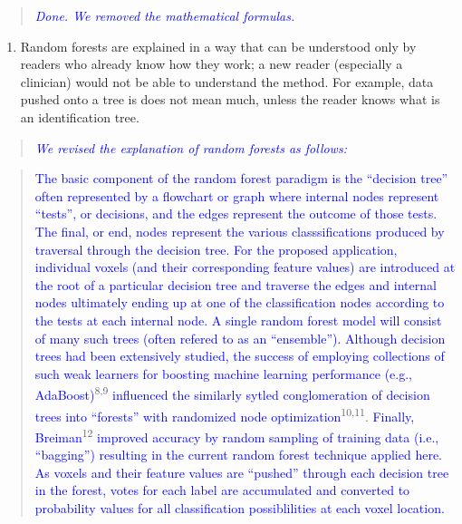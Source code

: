 \documentclass[12pt,]{article}
\providecommand{\tightlist}{%
  \setlength{\itemsep}{0pt}\setlength{\parskip}{0pt}}
\begin{document}
\begin{quote}
\emph{\textcolor{blue}{Done.  We removed the mathematical formulas.}}
\end{quote}

\begin{enumerate}
\def\labelenumi{\arabic{enumi}.}
\setcounter{enumi}{6}
\tightlist
\item
  Random forests are explained in a way that can be understood only by
  readers who already know how they work; a new reader (especially a
  clinician) would not be able to understand the method. For example,
  data pushed onto a tree is does not mean much, unless the reader knows
  what is an identification tree.
\end{enumerate}

\begin{quote}
\emph{\textcolor{blue}{
We revised the explanation of random forests as follows:}}
\end{quote}

\begin{quote}
\textcolor{blue}{The basic component of
the random forest paradigm is the ``decision tree'' often represented by a flowchart or
graph where internal nodes represent ``tests'', or decisions, and the edges represent the outcome of those tests.  The final, or end, nodes represent the various classsifications produced by traversal through the decision tree.  For the proposed application, individual
voxels (and their corresponding feature values) are introduced at the root of a particular
decision tree and traverse the edges and internal nodes ultimately ending up at one of
the classification nodes according to the tests at each internal node.  A single random
forest model will consist of many such trees (often refered to as an ``ensemble'').}
\textcolor{blue}{Although decision trees had been extensively studied, the success of employing collections of such weak learners for boosting machine learning performance
(e.g., AdaBoost)}\textsuperscript{8,9}
\textcolor{blue}{influenced the similarly sytled conglomeration of decision trees into ``forests'' with randomized node optimization}\textsuperscript{10,11}.
\textcolor{blue}{Finally, Breiman}\textsuperscript{12}
\textcolor{blue}{improved accuracy by random sampling of training data (i.e., ``bagging'') resulting
in the current random forest technique applied here.}
\textcolor{blue}{As voxels and their feature values are ``pushed'' through each decision tree in the forest,  votes for each label are accumulated and converted to probability values for all classification possiblilities at
each voxel location.}
\end{quote}
\end{document}
